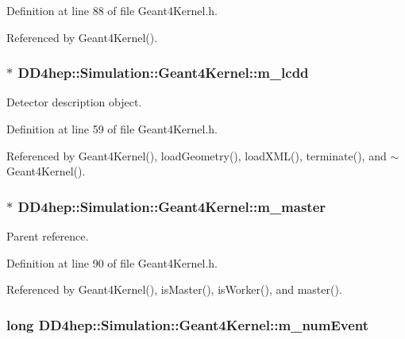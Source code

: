 Definition at line 88 of file Geant4Kernel.h.

Referenced by Geant4Kernel().\hypertarget{class_d_d4hep_1_1_simulation_1_1_geant4_kernel_a0181177a7c4b6862a83b3a34a64a3ce9}{
\subsubsection[{m\_\-lcdd}]{$\ast$ {\bf DD4hep::Simulation::Geant4Kernel::m\_\-lcdd}}}
\label{class_d_d4hep_1_1_simulation_1_1_geant4_kernel_a0181177a7c4b6862a83b3a34a64a3ce9}


Detector description object. 

Definition at line 59 of file Geant4Kernel.h.

Referenced by Geant4Kernel(), loadGeometry(), loadXML(), terminate(), and $\sim$Geant4Kernel().\hypertarget{class_d_d4hep_1_1_simulation_1_1_geant4_kernel_a5d1ef9677e88ba8fc503d1cb70b84cf8}{
\subsubsection[{m\_\-master}]{$\ast$ {\bf DD4hep::Simulation::Geant4Kernel::m\_\-master}}}
\label{class_d_d4hep_1_1_simulation_1_1_geant4_kernel_a5d1ef9677e88ba8fc503d1cb70b84cf8}


Parent reference. 

Definition at line 90 of file Geant4Kernel.h.

Referenced by Geant4Kernel(), isMaster(), isWorker(), and master().\hypertarget{class_d_d4hep_1_1_simulation_1_1_geant4_kernel_a5786c0e6c67534e109595f568df489a9}{
\subsubsection[{m\_\-numEvent}]{\setlength{\rightskip}{0pt plus 5cm}long {\bf DD4hep::Simulation::Geant4Kernel::m\_\-numEvent}}}
\label{class_d_d4hep_1_1_simulation_1_1_geant4_kernel_a5786c0e6c67534e109595f568df489a9}


